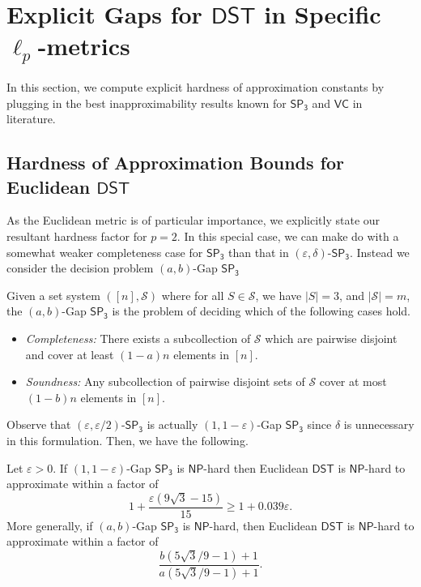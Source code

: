 \documentclass{article}\providecommand{\DeclareRedundantLanguages}[2]{}\usepackage[a4paper,margin=20mm]{geometry}
\newcommand{\1}{\textbf{1}}
\newcommand{\setpT}{$\mathsf{SP_3}$\xspace}
\newcommand{\dst}{$\mathsf{DST}$\xspace}
\newcommand{\np}{$\mathsf{NP}$\xspace}
\newcommand{\vcov}{$\mathsf{VC}$\xspace}
\begin{document}

\newpage

\appendix
\section{Explicit Gaps for \texorpdfstring{\dst}{DST} in Specific \texorpdfstring{$\ell_p$}{lp}-metrics}\label{sec:explicit}
In this section, we compute explicit hardness of approximation constants by plugging in the best inapproximability results known for \setpT and \vcov in literature.
\subsection{Hardness of Approximation Bounds for Euclidean \texorpdfstring{\dst}{DST}}
As the Euclidean metric is of particular importance, we explicitly state our resultant hardness factor for $p = 2$. In this special case, we can make do with a somewhat weaker completeness case for \setpT than that in $(\varepsilon, \delta)$-\setpT. Instead we consider the decision problem $(a,b)$-Gap \setpT 
\begin{definition}[$(a,b)$-Gap \setpT]
Given a set system $([n], \mathcal{S})$ where  for all $S \in \mathcal{S}$, we have $|S| = 3$, and $|\mathcal{S}| = m$, the  $(a,b)$-Gap \setpT is  the problem of deciding which of the following cases hold.
\begin{itemize}
    \item \textit{Completeness:} There exists a subcollection of $\mathcal{S}$ which are pairwise disjoint and cover at least $(1-a)n$ elements in $[n]$.
    \item \textit{Soundness:} Any subcollection of pairwise disjoint sets of $\mathcal{S}$ cover at most $(1-b)n$ elements in $[n]$.
\end{itemize}
\end{definition}
Observe that $(\varepsilon, \varepsilon/2)$-\setpT is actually $(1, 1-\varepsilon)$-Gap \setpT since $\delta$ is unnecessary in this formulation. Then, we have the following.
\begin{corollary} \label{cor: Euc hardness}
Let $\varepsilon>0$. If  $(1, 1-\varepsilon)$-Gap \setpT is \np-hard then 
Euclidean \dst is \np-hard to approximate within a factor of
\[
1 + \frac{\varepsilon(9\sqrt{3} -15)}{15} \geq 1 + 0.039\varepsilon.
\]
More generally, if $(a, b)$-Gap \setpT is \np-hard, then Euclidean \dst is \np-hard to approximate within a factor of
\[
\frac{b(5\sqrt{3}/9 - 1) + 1}{a(5\sqrt{3}/9 - 1) + 1}.
\]
\end{corollary}
\end{document}
